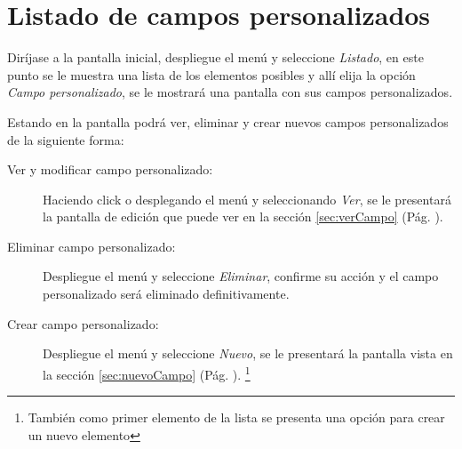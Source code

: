 \section{Listado de campos personalizados}
\label{sec:listadoCampos}
Dir\'ijase a la pantalla inicial, despliegue el men\'u \blackberry y seleccione
\emph{Listado}, en este punto se le muestra una lista de los elementos posibles
y all\'i elija la opci\'on \emph{Campo personalizado}, se le mostrar\'a una
pantalla con sus campos personalizados.

Estando en la pantalla podr\'a ver, eliminar y crear nuevos campos
personalizados de la siguiente forma:

\begin{description}
\item[Ver y modificar campo personalizado:]Haciendo click o desplegando el men\'u
\blackberry y seleccionando \emph{Ver}, se le presentar\'a la pantalla de
edici\'on que puede ver en la secci\'on \ref{sec:verCampo} (P\'ag.
\pageref{sec:verCampo}).
\item[Eliminar campo personalizado:]Despliegue el men\'u \blackberry y seleccione
\emph{Eliminar}, confirme su acci\'on y el campo personalizado ser\'a eliminado
definitivamente.
\item[Crear campo personalizado:]Despliegue el men\'u \blackberry y seleccione
\emph{Nuevo}, se le presentar\'a la pantalla vista en la
secci\'on \ref{sec:nuevoCampo}
(P\'ag. \pageref{sec:nuevoCampo}).
\footnote{Tambi\'en como primer elemento de la lista se presenta una opci\'on
para crear un nuevo elemento}
\end{description}
